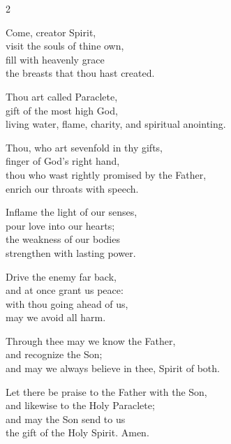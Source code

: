 \documentclass[12pt]{book}
\begin{document}
 
 \twosided[pc] %

\thispagestyle{empty}





\begin{multicols}{2}
\raggedcolumns
\begin{enpars}
Come, creator Spirit,\\
visit the souls of thine own,\\
fill with heavenly grace\\
the breasts that thou hast created.

Thou art called Paraclete,\\
gift of the most high God,\\
living water, flame, charity, and spiritual anointing.

Thou, who art sevenfold in thy gifts,\\
finger of God's right hand,\\
thou who wast rightly promised by the Father,\\
enrich our throats with speech.

Inflame the light of our senses,\\
pour love into our hearts;\\
the weakness of our bodies\\
strengthen with lasting power.

Drive the enemy far back,\\
and at once grant us peace:\\
with thou going ahead of us,\\
may we avoid all harm.

Through thee may we know the Father,\\
and recognize the Son;\\
and may we always believe in thee, Spirit of both.

Let there be praise to the Father with the Son,\\ and likewise to the Holy Paraclete;\\
and may the Son send to us\\
the gift of the Holy Spirit. Amen.
\end{enpars}
\end{multicols}
\end{document}
